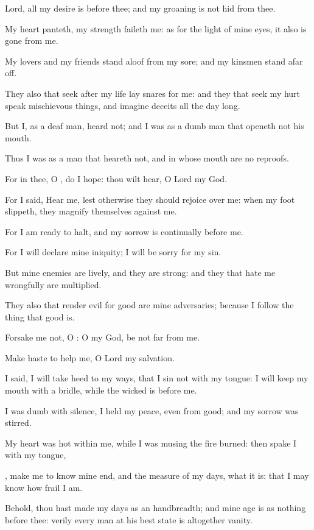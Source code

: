 \Verse Lord, all my desire is before thee; and my groaning is not hid from thee.

\Verse My heart panteth, my strength faileth me: as for the light of mine eyes, it also is gone from me.

\Verse My lovers and my friends stand aloof from my sore; and my kinsmen stand afar off.

\Verse They also that seek after my life lay snares for me: and they that seek my hurt speak mischievous things, and imagine deceits all the day long.

\Verse But I, as a deaf man, heard not; and I was as a dumb man that openeth not his mouth.

\Verse Thus I was as a man that heareth not, and in whose mouth are no reproofs.

\Verse For in thee, O \LORD, do I hope: thou wilt hear, O Lord my God.

\Verse For I said, Hear me, lest otherwise they should rejoice over me: when my foot slippeth, they magnify themselves against me.

\Verse For I am ready to halt, and my sorrow is continually before me.

\Verse For I will declare mine iniquity; I will be sorry for my sin.

\Verse But mine enemies are lively, and they are strong: and they that hate me wrongfully are multiplied.

\Verse They also that render evil for good are mine adversaries; because I follow the thing that good is.

\Verse Forsake me not, O \LORD: O my God, be not far from me.

\Verse Make haste to help me, O Lord my salvation.




\Chapter
\Verse I said, I will take heed to my ways, that I sin not with my tongue: I will keep my mouth with a bridle, while the wicked is before me.

\Verse I was dumb with silence, I held my peace, even from good; and my sorrow was stirred.

\Verse My heart was hot within me, while I was musing the fire burned: then spake I with my tongue,

\Verse \LORD, make me to know mine end, and the measure of my days, what it is: that I may know how frail I am.

\Verse Behold, thou hast made my days as an handbreadth; and mine age is as nothing before thee: verily every man at his best state is altogether vanity.

